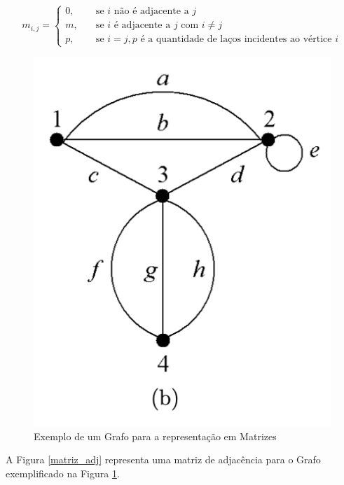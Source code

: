 \[ m_{i, j} =
  \begin{cases}
    0,       & \quad \text{se } i \text{ não é adjacente a } j \\
    m,  & \quad \text{se } i \text{ é adjacente a } j \text{ com } i \neq j \\
    p, & \quad \text{se } i = j, p \text { é a quantidade de laços incidentes ao vértice } i
  \end{cases}
\]

\begin{figure}[H]
    \begin{center}
        \caption{Exemplo de um Grafo para a representação em Matrizes}
        \label{grafo_matriz}
        \includegraphics[scale=0.7]{figuras/Embasamento/grafo.png}
    \end{center}
\end{figure}

A Figura \ref{matriz_adj} representa uma matriz de adjacência para o Grafo exemplificado na Figura \ref{grafo_matriz}.

